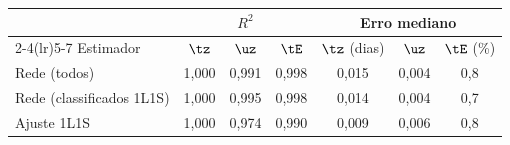 \begin{tabular}{lcccccc}
	\toprule
	 & \multicolumn{3}{c}{$R^2$} & \multicolumn{3}{c}{Erro mediano} \\
	\cmidrule(lr){2-4}\cmidrule(lr){5-7}
	Estimador & $\tz$ & $\uz$ & $\tE$ & $\tz$ (dias) & $\uz$ & $\tE$ (\%) \\
	\midrule
	Rede (todos) & 1{,}000 & 0{,}991 & 0{,}998 & 0{,}015 & 0{,}004 & 0{,}8 \\
	Rede (classificados 1L1S) & 1{,}000 & 0{,}995 & 0{,}998 & 0{,}014 & 0{,}004 & 0{,}7 \\
	Ajuste 1L1S & 1{,}000 & 0{,}974 & 0{,}990 & 0{,}009 & 0{,}006 & 0{,}8 \\
	\bottomrule
\end{tabular}
